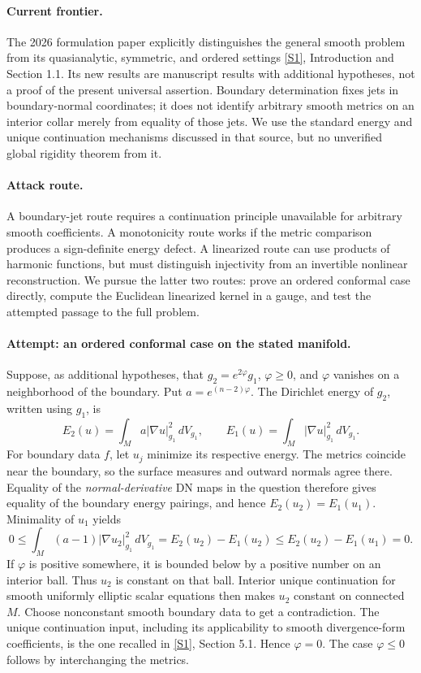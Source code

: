 \documentclass[11pt,a4paper]{article}
\newcommand{\sref}[2]{\hyperlink{source:#1:#2}{[S#2]}}
\numberwithin{equation}{section}
\begin{document}
\paragraph{Current frontier.}
The 2026 formulation paper explicitly distinguishes the general smooth
problem from its quasianalytic, symmetric, and ordered settings
\sref{30006770}{1}, Introduction and Section 1.1. Its new results are manuscript
results with additional hypotheses, not a proof of the present universal
assertion. Boundary determination fixes jets in boundary-normal coordinates;
it does not identify arbitrary smooth metrics on an interior collar merely
from equality of those jets. We use the standard energy and unique
continuation mechanisms discussed in that source, but no unverified global
rigidity theorem from it.

\paragraph{Attack route.}
A boundary-jet route requires a continuation principle unavailable for
arbitrary smooth coefficients. A monotonicity route works if the metric
comparison produces a sign-definite energy defect. A linearized route can
use products of harmonic functions, but must distinguish injectivity from
an invertible nonlinear reconstruction. We pursue the latter two routes:
prove an ordered conformal case directly, compute the Euclidean linearized
kernel in a gauge, and test the attempted passage to the full problem.

\paragraph{Attempt: an ordered conformal case on the stated manifold.}
Suppose, as additional hypotheses, that
$g_2=e^{2\varphi}g_1$, $\varphi\ge0$, and $\varphi$ vanishes on a
neighborhood of the boundary. Put $a=e^{(n-2)\varphi}$.
The Dirichlet energy of $g_2$, written using $g_1$, is
\[
 E_2(u)=\int_M a|\nabla u|_{g_1}^2\,dV_{g_1},
 \qquad E_1(u)=\int_M|\nabla u|_{g_1}^2\,dV_{g_1}.
\]
For boundary data $f$, let $u_j$ minimize its respective energy. The metrics
coincide near the boundary, so the surface measures and outward normals
agree there. Equality of the \emph{normal-derivative} DN maps in the question
therefore gives equality of the boundary energy pairings, and hence
$E_2(u_2)=E_1(u_1)$. Minimality of $u_1$ yields
\begin{equation}\label{eq176-monotone}
 0\le\int_M(a-1)|\nabla u_2|_{g_1}^2\,dV_{g_1}
     =E_2(u_2)-E_1(u_2)
     \le E_2(u_2)-E_1(u_1)=0.
\end{equation}
If $\varphi$ is positive somewhere, it is bounded below by a positive
number on an interior ball. Thus $u_2$ is constant on that ball. Interior
unique continuation for smooth uniformly elliptic scalar equations then
makes $u_2$ constant on connected $M$. Choose nonconstant smooth boundary
data to get a contradiction. The unique continuation input, including its
applicability to smooth divergence-form coefficients, is the one recalled
in \sref{30006770}{1}, Section 5.1. Hence $\varphi=0$.
The case $\varphi\le0$ follows by interchanging the metrics.
\end{document}
